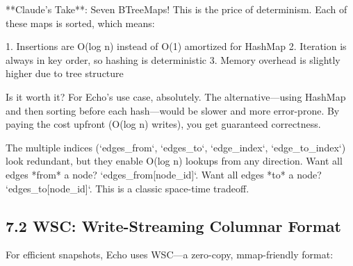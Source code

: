 \documentclass[
  11pt,
]{book}
\begin{document}
\begin{claudecommentary}
**Claude's Take**: Seven BTreeMaps! This is the price of determinism. Each of these maps is sorted, which means:

1. Insertions are O(log n) instead of O(1) amortized for HashMap
2. Iteration is always in key order, so hashing is deterministic
3. Memory overhead is slightly higher due to tree structure

Is it worth it? For Echo's use case, absolutely. The alternative—using HashMap and then sorting before each hash—would be slower and more error-prone. By paying the cost upfront (O(log n) writes), you get guaranteed correctness.

The multiple indices (`edges_from`, `edges_to`, `edge_index`, `edge_to_index`) look redundant, but they enable O(log n) lookups from any direction. Want all edges *from* a node? `edges_from[node_id]`. Want all edges *to* a node? `edges_to[node_id]`. This is a classic space-time tradeoff.
\end{claudecommentary}

\subsection{7.2 WSC: Write-Streaming Columnar
Format}\label{wsc-write-streaming-columnar-format}

For efficient snapshots, Echo uses WSC---a zero-copy, mmap-friendly
format:
\end{document}
